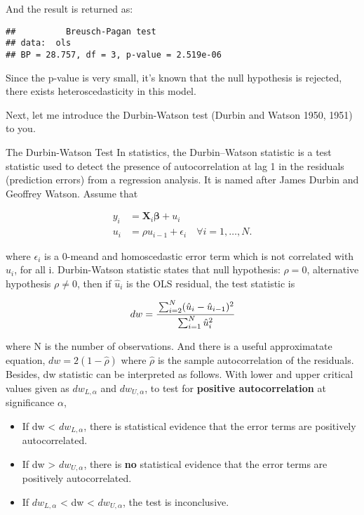 \documentclass[
  12pt,
]{article}
\begin{document}
And the result is returned as:

\begin{verbatim}
##          Breusch-Pagan test
## data:  ols
## BP = 28.757, df = 3, p-value = 2.519e-06
\end{verbatim}

Since the p-value is very small, it's known that the null hypothesis is rejected, there exists heteroscedasticity in this model.

Next, let me introduce the Durbin-Watson test (Durbin and Watson 1950, 1951) to you.

\begin{itembox}[1]{The Durbin-Watson Test}
In statistics, the Durbin–Watson statistic is a test statistic used to detect the presence of autocorrelation at lag 1 in the residuals (prediction errors) from a regression analysis. It is named after James Durbin and Geoffrey Watson.
Assume that

\begin{align*}
        y_i & = \mathbf{X}_i \mathbf{\beta} + u_i  \\
        u_i & = \rho u_{i-1} + \epsilon_i \quad \forall i = 1, \dots, N.
\end{align*}

where $\epsilon_i$ is a 0-meand and homoscedastic error term which is not correlated with $u_i$, for all i. Durbin-Watson statistic states that null hypothesis: $\rho = 0$, alternative hypothesis $\rho \neq 0$, then if $\hat{u}_i$ is the OLS residual, the test statistic is 

$$
    dw = \cfrac{\sum_{i=2}^{N} (\hat{u}_i - \hat{u}_{i-1})^2}{\sum_{i=1}^{N} \hat{u}_i^2}
$$

where N is the number of observations. And there is a useful approximatate equation, $dw = 2(1-\hat{\rho})$ where $\hat{\rho}$ is the sample autocorrelation of the residuals. Besides, dw statistic can be interpreted as follows.
With lower and upper critical values given as $dw_{L,\alpha}$ and $dw_{U,\alpha}$, to test for \textbf{positive autocorrelation} at significance $\alpha$, 

\begin{itemize}
\item If dw < $dw_{L,\alpha}$, there is statistical evidence that the error terms are positively autocorrelated.
\item If dw > $dw_{U,\alpha}$, there is \textbf{no} statistical evidence that the error terms are positively autocorrelated.
\item If $dw_{L,\alpha}$ < dw < $dw_{U,\alpha} $, the test is inconclusive.
\end{itemize}


\end{itembox}
\end{document}
